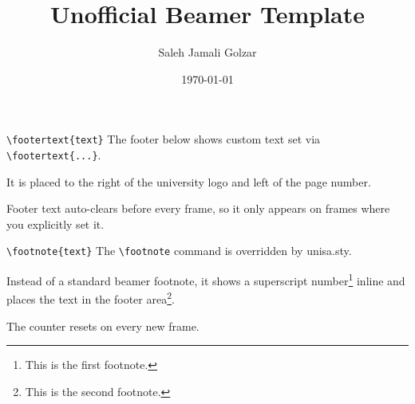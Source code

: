 \documentclass[notes, aspectratio=169]{beamer}       %
\title{Unofficial Beamer Template}
\author{Saleh Jamali Golzar}
\date{\today}
\begin{document}
 



    \begin{frame}{\texttt{\textbackslash footertext\{text\}}}
        The footer below shows custom text set via \texttt{\textbackslash footertext\{...\}}.

        It is placed to the right of the university logo and left of the page number.

        Footer text auto-clears before every frame, so it only appears on frames where you explicitly set it.
    \end{frame}

    \begin{frame}{\texttt{\textbackslash footnote\{text\}}}
        The \texttt{\textbackslash footnote} command is overridden by unisa.sty.

        Instead of a standard beamer footnote, it shows a superscript number\footnote{This is the first footnote.} inline and places the text in the footer area\footnote{This is the second footnote.}.

        The counter resets on every new frame.
    \end{frame}
\end{document}
